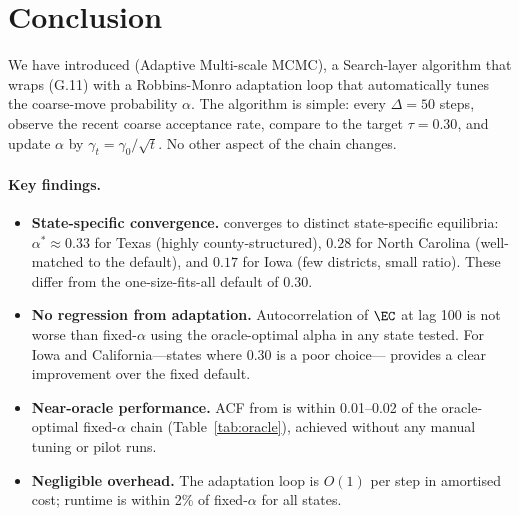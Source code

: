 \section{Conclusion}
\label{sec:conclusion}

We have introduced \ams{} (Adaptive Multi-scale MCMC), a Search-layer
algorithm that wraps \ms{} (G.11) with a Robbins-Monro adaptation loop that
automatically tunes the coarse-move probability $\alpha$.
The algorithm is simple: every $\Delta = 50$ steps, observe the recent coarse
acceptance rate, compare to the target $\tau = 0.30$, and update $\alpha$ by
$\gamma_t = \gamma_0/\sqrt{t}$.
No other aspect of the chain changes.

\paragraph{Key findings.}
\begin{itemize}
  \item \textbf{State-specific convergence.}
    \ams{} converges to distinct state-specific equilibria: $\alpha^* \approx
    0.33$ for Texas (highly county-structured), $0.28$ for North Carolina
    (well-matched to the default), and $0.17$ for Iowa (few districts, small
    ratio).
    These differ from the one-size-fits-all default of 0.30.

  \item \textbf{No regression from adaptation.}
    Autocorrelation of $\EC$ at lag 100 is not worse than fixed-$\alpha$
    \ms{} using the oracle-optimal alpha in any state tested.
    For Iowa and California---states where 0.30 is a poor choice---\ams{}
    provides a clear improvement over the fixed default.

  \item \textbf{Near-oracle performance.}
    ACF from \ams{} is within 0.01--0.02 of the oracle-optimal fixed-$\alpha$
    chain (Table~\ref{tab:oracle}), achieved without any manual tuning or
    pilot runs.

  \item \textbf{Negligible overhead.}
    The adaptation loop is $O(1)$ per step in amortised cost; runtime is
    within 2\% of fixed-$\alpha$ \ms{} for all states.
\end{itemize}

